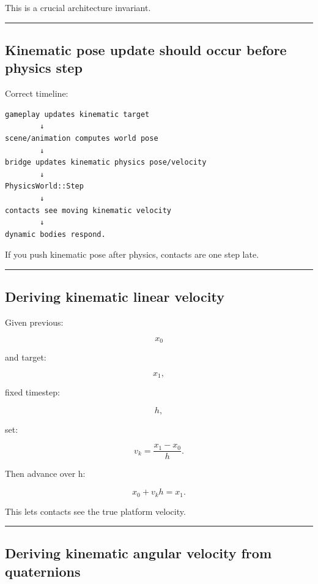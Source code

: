 This is a crucial architecture invariant.

\begin{center}\rule{0.5\linewidth}{0.5pt}\end{center}

\subsection{Kinematic pose update should occur before physics step}\label{06-engine-ii-ch037-kinematic-pose-update-should-occur-before-physics-step}

Correct timeline:

\begin{verbatim}
gameplay updates kinematic target
        ↓
scene/animation computes world pose
        ↓
bridge updates kinematic physics pose/velocity
        ↓
PhysicsWorld::Step
        ↓
contacts see moving kinematic velocity
        ↓
dynamic bodies respond.
\end{verbatim}

If you push kinematic pose after physics, contacts are one step late.

\begin{center}\rule{0.5\linewidth}{0.5pt}\end{center}

\subsection{Deriving kinematic linear velocity}\label{06-engine-ii-ch037-deriving-kinematic-linear-velocity}

Given previous:

\[
x_0
\]

and target:

\[
x_1,
\]

fixed timestep:

\[
h,
\]

set:

\[
\boxed{
v_k
=
\frac{x_1-x_0}{h}.
}
\]

Then advance over h:

\[
x_0+v_kh=x_1.
\]

This lets contacts see the true platform velocity.

\begin{center}\rule{0.5\linewidth}{0.5pt}\end{center}

\subsection{Deriving kinematic angular velocity from quaternions}\label{06-engine-ii-ch037-deriving-kinematic-angular-velocity-from-quaternions}

